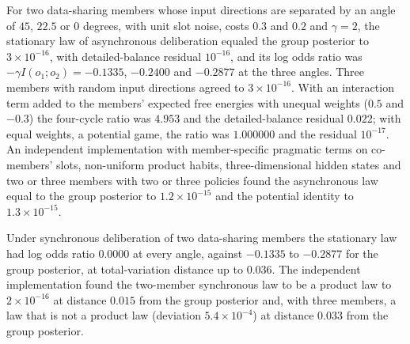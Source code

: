\begin{numcheck}\label{chk:agy-agency}
For two data-sharing members whose input directions are separated by an angle of $45$, $22.5$ or $0$ degrees, with unit slot noise, costs $0.3$ and $0.2$ and $\gamma=2$, the stationary law of asynchronous deliberation equaled the group posterior to $3\times10^{-16}$, with detailed-balance residual $10^{-16}$, and its log odds ratio was $-\gamma I(o_1;o_2)=-0.1335$, $-0.2400$ and $-0.2877$ at the three angles. Three members with random input directions agreed to $3\times10^{-16}$. With an interaction term added to the members' expected free energies with unequal weights ($0.5$ and $-0.3$) the four-cycle ratio was $4.953$ and the detailed-balance residual $0.022$; with equal weights, a potential game, the ratio was $1.000000$ and the residual $10^{-17}$. An independent implementation with member-specific pragmatic terms on co-members' slots, non-uniform product habits, three-dimensional hidden states and two or three members with two or three policies found the asynchronous law equal to the group posterior to $1.2\times10^{-15}$ and the potential identity to $1.3\times10^{-15}$.

Under synchronous deliberation of two data-sharing members the stationary law had log odds ratio $0.0000$ at every angle, against $-0.1335$ to $-0.2877$ for the group posterior, at total-variation distance up to $0.036$. The independent implementation found the two-member synchronous law to be a product law to $2\times10^{-16}$ at distance $0.015$ from the group posterior and, with three members, a law that is not a product law (deviation $5.4\times10^{-4}$) at distance $0.033$ from the group posterior.


\end{numcheck}
